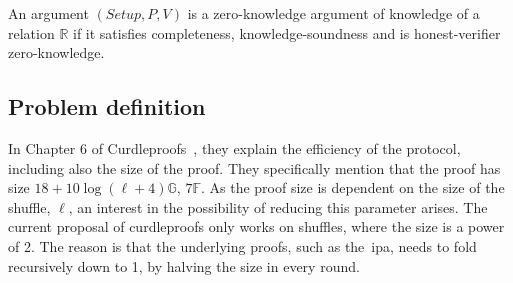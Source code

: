 \begin{definition}
    An argument $(Setup, P, V)$ is a zero-knowledge argument of knowledge of a relation $\mathbb{R}$ if it satisfies completeness, knowledge-soundness and is honest-verifier zero-knowledge.
\end{definition}

\subsection{Problem definition}\label{subsec:problem-definition}
In Chapter 6 of Curdleproofs~\cite{Curdleproofs}, they explain the efficiency of the protocol, including also the size of the proof.
They specifically mention that the proof has size $18+10 \log(\ell+4)\mathbb{G}$, $7\mathbb{F}$.
As the proof size is dependent on the size of the shuffle, $\ell$, an interest in the possibility of reducing this parameter arises.
The current proposal of curdleproofs only works on shuffles, where the size is a power of 2.
The reason is that the underlying proofs, such as the~\gls{ipa}, needs to fold recursively down to 1, by halving the size in every round.

